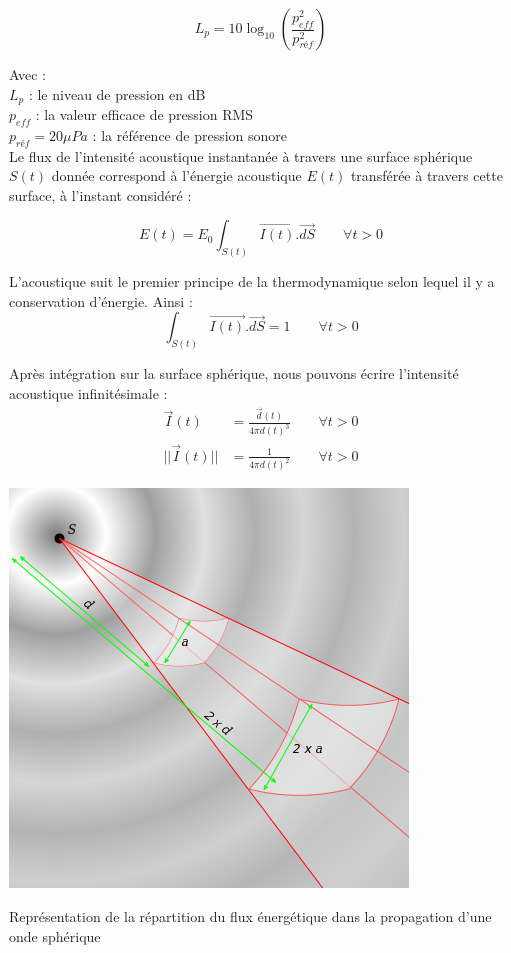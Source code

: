 \begin{equation} 
L_p = 10 \log_{10}(\frac{p_{eff}^2}{p_{réf}^2})
\end{equation}

Avec :\\
$L_p$ : le niveau de pression en dB \\
$p_{eff}$ : la valeur efficace de pression \gls{RMS} \\
$p_{réf} = 20 \mu Pa$ : la référence de pression sonore \\


Le flux de l'intensité acoustique instantanée à travers une surface sphérique $S(t)$ donnée correspond à l'énergie acoustique $E(t)$ transférée à travers cette surface, à l'instant considéré :

\begin{equation} 
E(t) = E_0 \int_{S(t)} \overrightarrow{I(t)}.\overrightarrow{dS} \qquad \forall t > 0
\end{equation}

L'acoustique suit le premier principe de la thermodynamique selon lequel il y a conservation d'énergie. Ainsi : 
\begin{equation} 
\int_{S(t)} \overrightarrow{I(t)}.\overrightarrow{dS} = 1 \qquad \forall t > 0
\end{equation}

Après intégration sur la surface sphérique, nous pouvons écrire l'intensité acoustique infinitésimale :
\begin{align} 
 \overrightarrow{I}(t) &= \frac{ \overrightarrow{d}(t)}{4\pi d(t)^3} \qquad \forall t > 0 \\
|| \overrightarrow{I}(t) || &= \frac{1}{4\pi d(t)^2} \qquad \forall t > 0
\end{align}

\begin{figureth}
	\includegraphics[width=0.5\linewidth]{images/flux}
	\caption{Représentation de la répartition du flux énergétique dans la propagation d'une onde sphérique}
	\label{flux}
\end{figureth}

